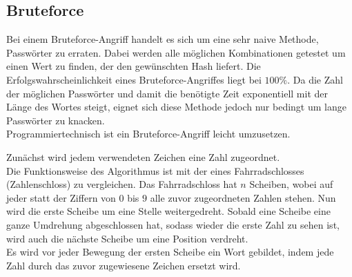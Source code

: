 \documentclass[12pt,a4paper]{scrartcl}
\numberwithin{equation}{section}
\numberwithin{myalgctr}{section}
\numberwithin{mytheoremctr}{section}
\begin{document}
	\subsection{Bruteforce}\label{bruteforce}
	Bei einem Bruteforce-Angriff handelt es sich um eine sehr naive Methode, Passwörter zu erraten. Dabei werden alle möglichen Kombinationen getestet um einen Wert zu finden, der den gewünschten Hash liefert. Die Erfolgswahrscheinlichkeit eines Bruteforce-Angriffes liegt bei $100\%$. Da die Zahl der möglichen Passwörter und damit die benötigte Zeit exponentiell mit der Länge des Wortes steigt, eignet sich diese Methode jedoch nur bedingt um lange Passwörter zu knacken.\\
	Programmiertechnisch ist ein Bruteforce-Angriff leicht umzusetzen.\\
	
	\par\noindent
	Zunächst wird jedem verwendeten Zeichen eine Zahl zugeordnet.\\ 
	Die Funktionsweise des Algorithmus ist mit der eines Fahrradschlosses (Zahlenschloss) zu vergleichen. Das Fahrradschloss hat $n$ Scheiben, wobei auf jeder statt der Ziffern von $0$ bis $9$ alle zuvor zugeordneten Zahlen stehen. Nun wird die erste Scheibe um eine Stelle weitergedreht. Sobald eine Scheibe eine ganze Umdrehung abgeschlossen hat, sodass wieder die erste Zahl zu sehen ist, wird auch die nächste Scheibe um eine Position verdreht. \\
	Es wird vor jeder Bewegung der ersten Scheibe ein Wort gebildet, indem jede Zahl durch das zuvor zugewiesene Zeichen ersetzt wird.
\end{document}
